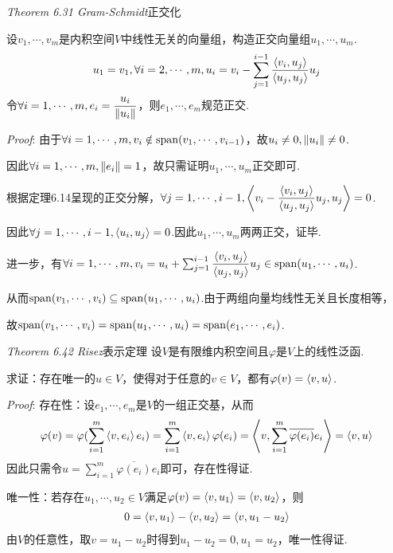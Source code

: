 \textit{Theorem 6.31 Gram-Schmidt}{\kaishu 正交化}

设\(v_1,\cdots,v_m\)是内积空间\(V\)中线性无关的向量组，构造正交向量组\(u_1,\cdots,u_m\).
    \begin{align*}
        u_1=v_1,\forall i=2,\cdots,m,u_i=v_i-\sum_{j=1}^{i-1} \dfrac{\left\langle v_i,u_j \right\rangle}{\left\langle u_j,u_j \right\rangle}u_j
    \end{align*}
令\(\forall i=1,\cdots,m,e_i=\dfrac{u_i}{\left\lVert u_i \right\rVert}\)，则\(e_1,\cdots,e_m\)规范正交.

\textit{Proof}:
由于\(\forall i=1,\cdots,m,v_i \notin \mathrm{span}(v_1,\cdots,v_{i-1})\)，故\(u_i \ne 0,\left\lVert u_i \right\rVert \ne 0\).

因此\(\forall i=1,\cdots,m,\left\lVert e_i \right\rVert=1\)，故只需证明\(u_1,\cdots,u_m\)正交即可.

根据定理6.14呈现的正交分解，\(\forall j=1,\cdots,i-1,\left\langle v_i-\dfrac{\left\langle v_i,u_j \right\rangle}{\left\langle u_j,u_j \right\rangle}u_j,u_j \right\rangle=0\).

因此\(\forall j=1,\cdots,i-1,\left\langle u_i,u_j \right\rangle=0\).因此\(u_1,\cdots,u_m\)两两正交，证毕.

进一步，有\(\forall i=1,\cdots,m,v_i=u_i+\sum_{j=1}^{i-1} \dfrac{\left\langle v_i,u_j \right\rangle}{\left\langle u_j,u_j \right\rangle}u_j \in \mathrm{span}(u_1,\cdots,u_i)\).

从而\(\mathrm{span}(v_1,\cdots,v_i) \subseteq \mathrm{span}(u_1,\cdots,u_i)\).由于两组向量均线性无关且长度相等，

故\(\mathrm{span}(v_1,\cdots,v_i)=\mathrm{span}(u_1,\cdots,u_i)=\mathrm{span}(e_1,\cdots,e_i)\).

\hspace*{\fill}

\textit{Theorem 6.42 Risez}{\kaishu 表示定理}
设\(V\)是有限维内积空间且\(\varphi\)是\(V\)上的线性泛函.

求证：存在唯一的\(u \in V\)，使得对于任意的\(v \in V\)，都有\(\varphi(v)=\left\langle v,u \right\rangle\).

\textit{Proof}:
存在性：设\(e_1,\cdots,e_m\)是\(V\)的一组正交基，从而
    \begin{align*}
        \varphi(v)=\varphi(\sum_{i=1}^m \left\langle v,e_i \right\rangle e_i)=\sum_{i=1}^m \left\langle v,e_i \right\rangle\varphi(e_i)
        =\left\langle v,\sum_{i=1}^m \overline{\varphi(e_i)}e_i \right\rangle=\left\langle v,u \right\rangle
    \end{align*}
因此只需令\(u=\sum_{i=1}^m \overline{\varphi(e_i)}e_i\)即可，存在性得证.

唯一性：若存在\(u_1,\cdots,u_2 \in V\)满足\(\varphi(v)=\left\langle v,u_1 \right\rangle=\left\langle v,u_2 \right\rangle\)，则
    \begin{align*}
        0=\left\langle v,u_1 \right\rangle-\left\langle v,u_2 \right\rangle=\left\langle v,u_1-u_2 \right\rangle
    \end{align*}
由\(V\)的任意性，取\(v=u_1-u_2\)时得到\(u_1-u_2=0,u_1=u_2\)，唯一性得证.


